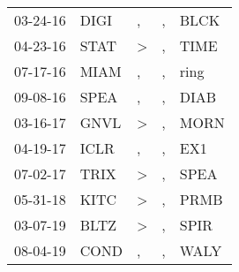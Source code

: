 \begin{supertabular}{p{0.07\textwidth}p{0.06\textwidth}p{0.02\textwidth}p{0.02\textwidth}p{0.06\textwidth}}
          03-24-16\textsuperscript{} &           DIGI\textsuperscript{} &                , &             , &           BLCK\textsuperscript{} \\
          04-23-16\textsuperscript{} &           STAT\textsuperscript{} &     \textgreater &             , &           TIME\textsuperscript{} \\
          07-17-16\textsuperscript{} &           MIAM\textsuperscript{} &                , &             , &           ring\textsuperscript{} \\
          09-08-16\textsuperscript{} &           SPEA\textsuperscript{} &                , &             , &           DIAB\textsuperscript{} \\
          03-16-17\textsuperscript{} &           GNVL\textsuperscript{} &     \textgreater &             , &           MORN\textsuperscript{} \\
          04-19-17\textsuperscript{} &           ICLR\textsuperscript{} &                , &             , &            EX1\textsuperscript{} \\
          07-02-17\textsuperscript{} &           TRIX\textsuperscript{} &     \textgreater &             , &           SPEA\textsuperscript{} \\
          05-31-18\textsuperscript{} &           KITC\textsuperscript{} &     \textgreater &             , &           PRMB\textsuperscript{} \\
          03-07-19\textsuperscript{} &           BLTZ\textsuperscript{} &     \textgreater &             , &           SPIR\textsuperscript{} \\
          08-04-19\textsuperscript{} &           COND\textsuperscript{} &                , &             , &           WALY\textsuperscript{} \\
\end{supertabular}
